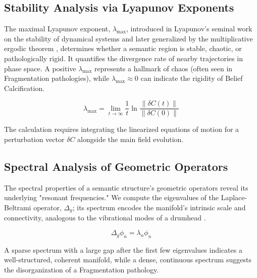 
\subsection{Stability Analysis via Lyapunov Exponents}
\label{17.3.2:stability_analysis_via_lyapunov_exponents}

The maximal Lyapunov exponent, \(\lambda_{\max}\), introduced in Lyapunov's seminal work on the stability of dynamical systems and later generalized by the multiplicative ergodic theorem \autocite{Lyapunov1907, Oseledets1968}, determines whether a semantic region is stable, chaotic, or pathologically rigid. It quantifies the divergence rate of nearby trajectories in phase space. A positive \(\lambda_{\max}\) represents a hallmark of chaos (often seen in Fragmentation pathologies), while \(\lambda_{\max} \approx 0\) can indicate the rigidity of Belief Calcification.

\begin{equation}
\lambda_{\max} = \lim_{t \to \infty} \frac{1}{t} \ln \frac{\|\delta C(t)\|}{\|\delta C(0)\|}
\end{equation}

The calculation requires integrating the linearized equations of motion for a perturbation vector \(\delta C\) alongside the main field evolution.


\subsection{Spectral Analysis of Geometric Operators}
\label{17.3.3:spectral_analysis_of_geometric_operators}

The spectral properties of a semantic structure's geometric operators reveal its underlying "resonant frequencies." We compute the eigenvalues of the Laplace-Beltrami operator, \(\Delta_g\); its spectrum encodes the manifold's intrinsic scale and connectivity, analogous to the vibrational modes of a drumhead \autocite{Chung1997}.

\begin{equation}
\Delta_g \phi_n = \lambda_n \phi_n
\end{equation}

A sparse spectrum with a large gap after the first few eigenvalues indicates a well-structured, coherent manifold, while a dense, continuous spectrum suggests the disorganization of a Fragmentation pathology.

